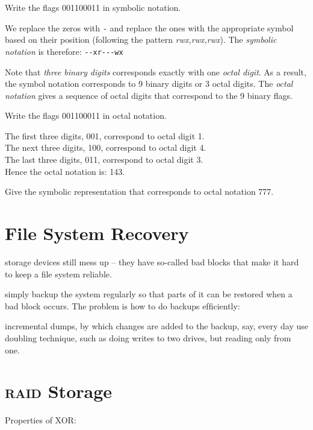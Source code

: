 
\begin{example}
Write the flags 001100011 in symbolic notation.

We replace the zeros with \lstinline{-} and replace the ones with the 
appropriate symbol based on their position 
(following the pattern \textit{rwx,rwx,rwx}). 
The \textit{symbolic notation} is therefore: \lstinline{--xr---wx}

\end{example}

\frmrule


Note that \textit{three binary digits} corresponds exactly with one \textit{octal digit}. 
As a result, the symbol notation corresponds to 9 binary digits or 3 octal digits. 
The \textit{octal notation} gives a sequence of octal digits that correspond to the 
9 binary flags. 

\frmrule

\begin{example}
Write the flags 001100011 in octal notation.

The first three digits, 001, correspond to octal digit 1. \\
The next three digits, 100, correspond to octal digit 4. \\
The last three digits, 011, correspond to octal digit 3. \\
Hence the octal notation is: 143.
\end{example}

\begin{example}
Give the symbolic representation that corresponds to octal notation 777.
\end{example}




\section{File System Recovery}

storage devices still mess up – they have
so-called bad blocks that make it hard to keep a ﬁle
system reliable.

simply backup the system regularly so that
parts of it can be restored when a bad block occurs.
The problem is how to do backups efﬁciently:

incremental dumps, by which changes are added
to the backup, say, every day
use doubling technique, such as doing writes to
two drives, but reading only from one.




\section{\textsc{raid} Storage}

Properties of XOR: